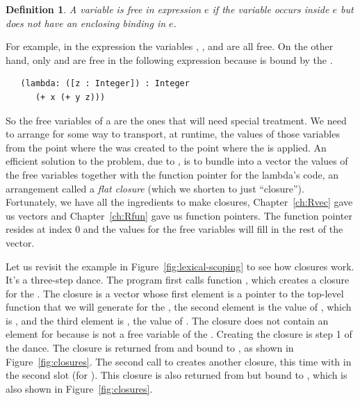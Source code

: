 \documentclass[11pt]{book}
\newtheorem{definition}[theorem]{Definition}
\begin{document}
\begin{definition}
A variable is \emph{free in expression} $e$ if the variable occurs
inside $e$ but does not have an enclosing binding in $e$.
\end{definition}

For example, in the expression  the variables
, , and  are all free.  On the other hand,
only  and  are free in the following expression
because  is bound by the .
\begin{lstlisting}
   (lambda: ([z : Integer]) : Integer
      (+ x (+ y z)))
\end{lstlisting}

So the free variables of a  are the ones that will need
special treatment. We need to arrange for some way to transport, at
runtime, the values of those variables from the point where the
 was created to the point where the  is
applied. An efficient solution to the problem, due to
\citet{Cardelli:1983aa}, is to bundle into a vector the values of the
free variables together with the function pointer for the lambda's
code, an arrangement called a \emph{flat closure} (which we shorten to
just ``closure'').   Fortunately,
we have all the ingredients to make closures, Chapter~\ref{ch:Rvec}
gave us vectors and Chapter~\ref{ch:Rfun} gave us function
pointers. The function pointer resides at index $0$ and the
values for the free variables will fill in the rest of the vector.

Let us revisit the example in Figure~\ref{fig:lexical-scoping} to see
how closures work. It's a three-step dance. The program first calls
function , which creates a closure for the . The
closure is a vector whose first element is a pointer to the top-level
function that we will generate for the , the second
element is the value of , which is , and the third
element is , the value of . The closure does not
contain an element for  because  is not a free
variable of the . Creating the closure is step 1 of the
dance. The closure is returned from  and bound to , as
shown in Figure~\ref{fig:closures}.
%
The second call to  creates another closure, this time with
 in the second slot (for ). This closure is also
returned from  but bound to , which is also shown in
Figure~\ref{fig:closures}.
\end{document}
